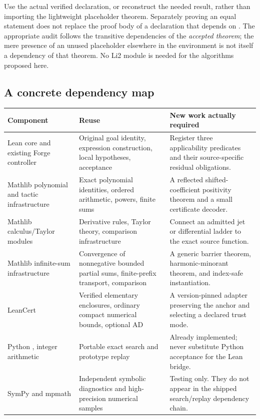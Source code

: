 \documentclass[11pt,a4paper]{article}
\theoremstyle{definition}\newtheorem{definition}[theorem]{Definition}
\newcommand{\code}[1]{\texttt{\detokenize{#1}}}
\begin{document}
Use the actual verified declaration, or reconstruct the needed result, rather
than importing the lightweight placeholder theorem. Separately proving an equal
statement does not replace the proof body of a declaration that depends on
\code{sorryAx}. The appropriate audit follows the transitive dependencies of
the \emph{accepted theorem}; the mere presence of an unused placeholder elsewhere
in the environment is not itself a dependency of that theorem. No Li2 module is
needed for the algorithms proposed here.

\subsection{A concrete dependency map}

\begin{longtable}{@{}P{.24\textwidth}P{.33\textwidth}P{.36\textwidth}@{}}
\toprule
Component & Reuse & New work actually required \\
\midrule\endhead
Lean core and existing Forge controller &
Original goal identity, expression construction, local hypotheses, acceptance &
Register three applicability predicates and their source-specific residual obligations. \\
Mathlib polynomial and tactic infrastructure &
Exact polynomial identities, ordered arithmetic, powers, finite sums &
A reflected shifted-coefficient positivity theorem and a small certificate decoder. \\
Mathlib calculus/Taylor modules &
Derivative rules, Taylor theory, comparison infrastructure &
Connect an admitted jet or differential ladder to the exact source function. \\
Mathlib infinite-sum infrastructure &
Convergence of nonnegative bounded partial sums, finite-prefix transport, comparison &
A generic barrier theorem, harmonic-minorant theorem, and index-safe instantiation. \\
LeanCert &
Verified elementary enclosures, ordinary compact numerical bounds, optional AD &
A version-pinned adapter preserving the anchor and selecting a declared trust mode. \\
Python \code{fractions}, integer arithmetic &
Portable exact search and prototype replay &
Already implemented; never substitute Python acceptance for the Lean bridge. \\
SymPy and mpmath &
Independent symbolic diagnostics and high-precision numerical samples &
Testing only. They do not appear in the shipped search/replay dependency chain. \\
\bottomrule
\end{longtable}
\end{document}
